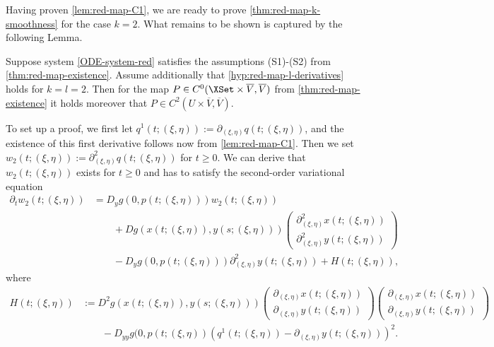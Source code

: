 \documentclass[a4paper]{siamart190516}
\begin{document}
Having proven \cref{lem:red-map-C1}, we are ready to prove \cref{thm:red-map-k-smoothness} for the case $k=2$. What remains to be shown is captured by the following Lemma.

\begin{lemma}\label{lem:red-map-C2}
Suppose system \cref{ODE-system-red} satisfies the assumptions (S1)-(S2) from \cref{thm:red-map-existence}. 
Assume additionally that \cref{hyp:red-map-l-derivatives} holds for $k=l=2$. Then for the map 
$P \in C^0(\XSet \times \overline{V}, \overline{V})$ from \cref{thm:red-map-existence} it holds moreover that 
$P \in  C^2(U \times \overline{V}, \overline{V})$.
\end{lemma}

To set up a proof, we first let $q^1(t; (\xi,\eta)) := \partial_{(\xi,\eta)}
q(t;(\xi,\eta))$, and the existence of this first derivative follows now from \cref{lem:red-map-C1}. Then we set $w_2(t; (\xi,\eta)) := \partial^2_{(\xi,\eta)} q(t;(\xi,\eta))$ 
for $t \geq 0$. We can derive that $w_2(t; (\xi,\eta))$ exists for $t \geq 0$ and has to satisfy the second-order variational equation
\begin{align*}
\partial_t w_2(t;(\xi,\eta)) &= D_y g(0,p(t;(\xi,\eta))) w_2(t;(\xi,\eta)) \\
&\qquad + D g(x(t;(\xi,\eta)),y(s;(\xi,\eta))) \begin{pmatrix} \partial^2_{(\xi,\eta)}x(t; (\xi,\eta)) \\ \partial^2_{(\xi,\eta)}y(t; (\xi,\eta)) \end{pmatrix} \\
&\qquad -  D_y g(0,p(t;(\xi,\eta))) \partial^2_{(\xi,\eta)}y(t; (\xi,\eta)) + H(t; (\xi,\eta)), 
\end{align*}
where
\[
\begin{aligned}
	H(t; (\xi,\eta))  
		&:=D^2 g(x(t;(\xi,\eta)),y(s;(\xi,\eta))) \begin{pmatrix} \partial_{(\xi,\eta)}x(t; (\xi,\eta)) \\ \partial_{(\xi,\eta)}y(t; (\xi,\eta)) \end{pmatrix}  
						\begin{pmatrix} \partial_{(\xi,\eta)}x(t; (\xi,\eta)) \\ \partial_{(\xi,\eta)}y(t; (\xi,\eta)) \end{pmatrix}  \\
		& \qquad  - D_{yy} g(0,p(t;(\xi,\eta)) \left( q^1(t;(\xi,\eta)) - \partial_{(\xi,\eta)}y(t; (\xi,\eta))  \right)^2.
\end{aligned}
\]
\end{document}
